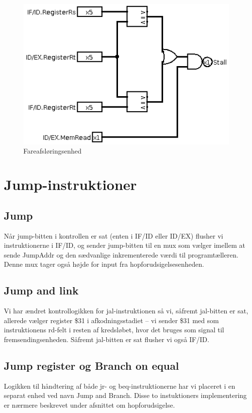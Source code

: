 \documentclass[10pt,a4paper,danish]{article}
\begin{document}
\begin{figure}[htb]
\begin{center}
\leavevmode
\includegraphics[width=1\textwidth]{hazard_detection_unit.png}
\end{center}
\caption{Fareafsløringsenhed}
\label{fig:hdu} 
\end{figure}

\section{Jump-instruktioner}

\subsection{Jump}
Når jump-bitten i kontrollen er sat (enten i IF/ID eller ID/EX) flusher vi 
instruktionerne i IF/ID, og sender jump-bitten til en mux som vælger imellem
at sende JumpAddr og den sædvanlige inkrementerede værdi til programtælleren.
Denne mux tager også højde for input fra hopforudsigelsesenheden. 

\subsection{Jump and link}
Vi har ændret kontrollogikken for jal-instruktionen så vi, såfremt
jal-bitten er sat, allerede vælger register \$31 i afkodningsstadiet
 -- vi sender \$31 med som instruktionens rd-felt i resten af kredsløbet,
hvor det bruges som signal til fremsendingsenheden. Såfremt jal-bitten 
er sat flusher vi også IF/ID. 

\subsection{Jump register og Branch on equal}
Logikken til håndtering af både jr- og beq-instruktionerne har vi 
placeret i en separat enhed ved navn Jump and Branch. Disse to 
instuktioners implementering er nærmere beskrevet under afsnittet
om hopforudsigelse. 
\end{document}
